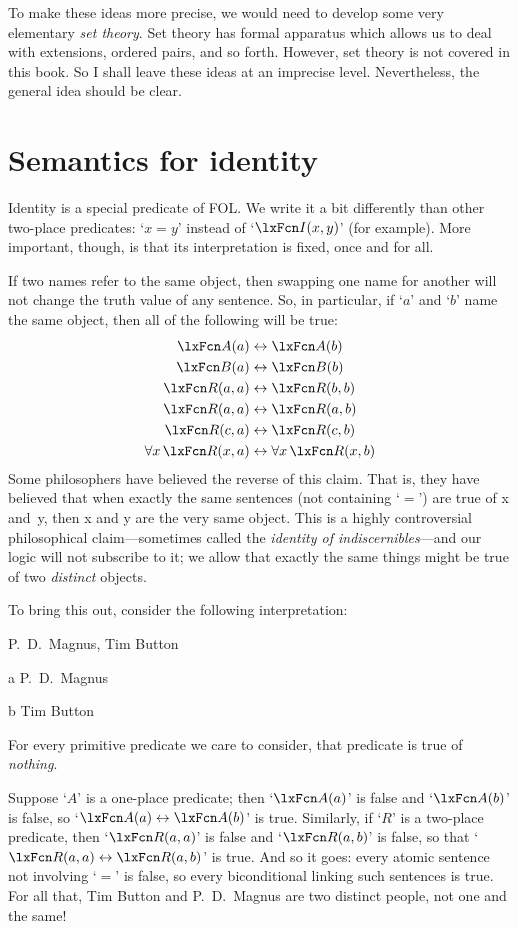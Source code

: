 To make these ideas more precise, we would need to develop some very elementary \emph{set theory}. Set theory has formal apparatus which allows us to deal with extensions, ordered pairs, and so forth. However, set theory is not covered in this book. So I shall leave these ideas at an imprecise level. Nevertheless, the general idea should be clear.


\section{Semantics for identity}
Identity is a special predicate of FOL. We write it a bit differently than other two-place predicates: `$x=y$' instead of `$\atom{I}{x,y}$' (for example). More important, though, is that its interpretation is fixed, once and for all.

If two names refer to the same object, then swapping one name for another will not change the truth value of any sentence. So, in particular, if `$a$' and `$b$' name the same object, then all of the following will be true:\label{model.nonidentity}
	\begin{align*}
	 	\atom{A}{a} &\eiff \atom{A}{b} \\
	 	\atom{B}{a} &\eiff \atom{B}{b}\\
		\atom{R}{a,a} &\eiff \atom{R}{b,b}\\
		\atom{R}{a,a} & \eiff \atom{R}{a,b}\\
		\atom{R}{c,a} &\eiff \atom{R}{c,b}\\
		\forall x\, \atom{R}{x,a} &\eiff \forall x\, \atom{R}{x,b}
	\end{align*}
Some philosophers have believed the reverse of this claim. That is, they have believed that when exactly the same sentences (not containing `$=$') are true of x and~y, then x and y are the very same object. This is a highly controversial philosophical claim---sometimes called the \emph{identity of indiscernibles}---and our logic will not subscribe to it; we allow that exactly the same things might be true of two \emph{distinct} objects.

To bring this out, consider the following interpretation:
	\begin{ekey}
		\item[\text{domain}] P.~D.\ Magnus, Tim Button
		\item[a] P.~D.\ Magnus
		\item[b] Tim Button
		\item[\atom{\metav{R}}{x_1,\dots, x_n}] For every primitive
		predicate  we care to consider, that predicate is true of
		\emph{nothing}.
	\end{ekey}
Suppose `$A$' is a one-place predicate; then `$\atom{A}{a}$' is false and `$\atom{A}{b}$' is false, so `$\atom{A}{a} \eiff \atom{A}{b}$' is true. Similarly, if `$R$' is a two-place predicate, then `$\atom{R}{a,a}$' is false and `$\atom{R}{a,b}$' is false, so that `$\atom{R}{a,a} \eiff \atom{R}{a,b}$' is true. And so it goes: every atomic sentence not involving `$=$' is false, so every biconditional linking such sentences is true. For all that, Tim Button and P.~D.\ Magnus are two distinct people, not one and the same!

